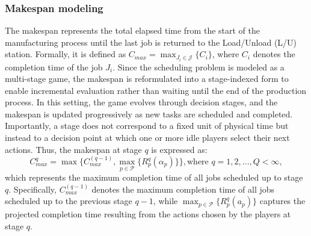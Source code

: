 \documentclass[preprint, 3p, review, 12pt]{elsarticle}
\begin{document}
\subsubsection{Makespan modeling}
The makespan represents the total elapsed time from the start of the manufacturing process until the last job is returned to the Load/Unload (L/U) station. Formally, it is defined as $C_{max} = \displaystyle \max_{J_i \in \mathcal{J}}\{C_i\}$, where $C_i$ denotes the completion time of the job $J_i$. Since the scheduling problem is modeled as a multi-stage game, the makespan is reformulated into a stage-indexed form to enable incremental evaluation rather than waiting until the end of the production process. In this setting, the game evolves through decision stages, and the makespan is updated progressively as new tasks are scheduled and completed. Importantly, a stage does not correspond to a fixed unit of physical time but instead to a decision point at which one or more idle players select their next actions. Thus, the makespan at stage $q$ is expressed as:
\begin{equation}
    \label{ep:Cq}
    C_{max}^{q} = \max{\{ C_{max}^{(q-1)}, \max_{p \in \mathcal{P}}{\{R^q_p(\alpha_p)\}}} \}, \text{where } q = 1, 2, ..., Q<\infty,
\end{equation}
which represents the maximum completion time of all jobs scheduled up to stage $q$. Specifically, $C_{max}^{(q-1)}$ denotes the maximum completion time of all jobs scheduled up to the previous stage $q-1$, while $\displaystyle \max_{p \in \mathcal{P}}\{R^q_p(a_p)\}$ captures the projected completion time resulting from the actions chosen by the players at stage $q$. 
\end{document}
